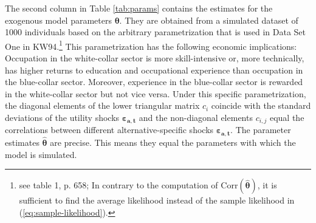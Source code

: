 The second column in Table \ref{tab:params} contains the estimates for the exogenous model parameters $\pmb{\theta}$. They are obtained from a simulated dataset of 1000 individuals based on the arbitrary parametrization that is used in Data Set One in KW94.\footnote{see table 1, p. 658; In contrary to the computation of $\text{Corr}(\pmb{\hat{\theta}})$, it is sufficient to find the average likelihood instead of the sample likelihood in (\ref{eq:sample-likelihood}).} 
This parametrization has the following economic implications: Occupation in the white-collar sector is more skill-intensive or, more technically, has higher returns to education and occupational experience than occupation in the blue-collar sector. Moreover, experience in the blue-collar sector is rewarded in the white-collar sector but not vice versa.
Under this specific parametrization, the diagonal elements of the lower triangular matrix $c_{i}$ coincide with the standard deviations of the utility shocks $\pmb{\varepsilon_{a,t}}$ and the non-diagonal elements $c_{i,j}$ equal the correlations between different alternative-specific shocks $\pmb{\varepsilon_{a,t}}$.
The parameter estimates $\pmb{\hat{\theta}}$ are precise. This means they equal the parameters with which the model is simulated.

